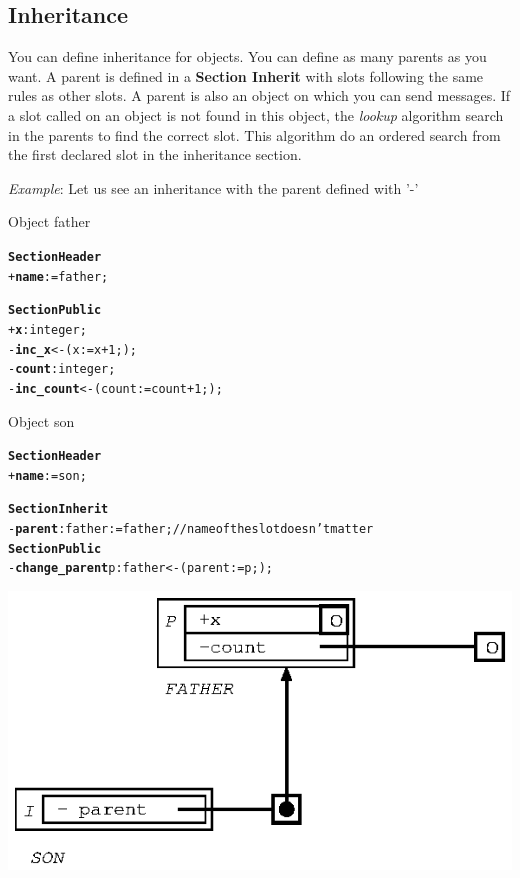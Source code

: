 \documentclass[11pt]{mybook}
\begin{document}
\subsection{Inheritance}
\label{quickstart:oo_language:inheritance}
%
You can define inheritance for objects. You can define as many parents as you want.
A parent is defined in a {\bf{}Section Inherit} with slots following the same rules as other slots.
A parent is also an object on which you can send messages.
If a slot called on an object is not found in this object, the {\it{}lookup} algorithm search in the parents to find the correct slot.
This algorithm do an ordered search from the first declared slot in the inheritance section.

{\it{}Example}: Let us see an inheritance with the parent defined with '-'
\begin{center}
Object {\sc{}father}
\end{center}
\begin{alltt} 
{\bf{}Section Header}
  + {\bf{}name}     := {\sc{}father};          

{\bf{}Section Public}
  + {\bf{}x}    :{\sc{}integer};
  - {\bf{}inc\_x} <- ( x := x + 1; );
  - {\bf{}count}:{\sc{}integer};
  - {\bf{}inc\_count} <- ( count := count + 1; );
\end{alltt}
\begin{center}
Object {\sc{}son}
\end{center}
\begin{alltt} 
{\bf{}Section Header}
  + {\bf{}name}     := {\sc{}son};          

{\bf{}Section Inherit}
  - {\bf{}parent}:{\sc{}father} := {\sc{}father};       // name of the slot doesn't matter
{\bf{}Section Public}
  - {\bf{}change\_parent} p:{\sc{}father} <- ( parent := p; );
\end{alltt}
\begin{center}
\includegraphics[scale=1.0]{figures/inherit_minus_0}
\end{center}
\end{document}
